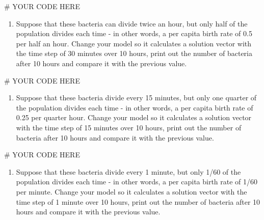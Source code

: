 \documentclass[
  letterpaper,
  DIV=11,
  numbers=noendperiod]{scrreprt}
\newenvironment{Shaded}{\begin{snugshade}}{\end{snugshade}}
\newcommand{\CommentTok}[1]{\textcolor[rgb]{0.37,0.37,0.37}{#1}}
\providecommand{\tightlist}{%
  \setlength{\itemsep}{0pt}\setlength{\parskip}{0pt}}\usepackage{longtable,booktabs,array}
\begin{document}
\begin{Shaded}
\begin{Highlighting}[]
\CommentTok{\# YOUR CODE HERE}
\end{Highlighting}
\end{Shaded}

\begin{enumerate}
\def\labelenumi{\arabic{enumi}.}
\setcounter{enumi}{1}
\tightlist
\item
  Suppose that these bacteria can divide twice an hour, but only half of
  the population divides each time - in other words, a per capita birth
  rate of 0.5 per half an hour. Change your model so it calculates a
  solution vector with the time step of 30 minutes over 10 hours, print
  out the number of bacteria after 10 hours and compare it with the
  previous value.
\end{enumerate}

\begin{Shaded}
\begin{Highlighting}[]
\CommentTok{\# YOUR CODE HERE}
\end{Highlighting}
\end{Shaded}

\begin{enumerate}
\def\labelenumi{\arabic{enumi}.}
\setcounter{enumi}{2}
\tightlist
\item
  Suppose that these bacteria divide every 15 minutes, but only one
  quarter of the population divides each time - in other words, a per
  capita birth rate of 0.25 per quarter hour. Change your model so it
  calculates a solution vector with the time step of 15 minutes over 10
  hours, print out the number of bacteria after 10 hours and compare it
  with the previous value.
\end{enumerate}

\begin{Shaded}
\begin{Highlighting}[]
\CommentTok{\# YOUR CODE HERE}
\end{Highlighting}
\end{Shaded}

\begin{enumerate}
\def\labelenumi{\arabic{enumi}.}
\setcounter{enumi}{3}
\tightlist
\item
  Suppose that these bacteria divide every 1 minute, but only 1/60 of
  the population divides each time - in other words, a per capita birth
  rate of 1/60 per minute. Change your model so it calculates a solution
  vector with the time step of 1 minute over 10 hours, print out the
  number of bacteria after 10 hours and compare it with the previous
  value.
\end{enumerate}
\end{document}
